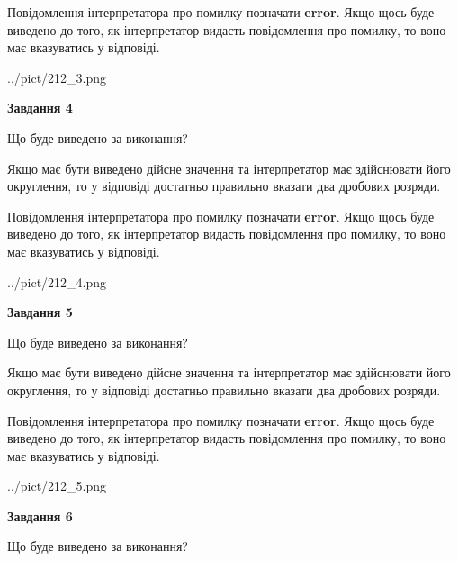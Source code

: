 \documentclass[12pt, ukrainian]{article}
\begin{document}
{\begin {Large}
Повідомлення інтерпретатора про помилку позначати \textbf{error}.
Якщо щось буде виведено до того, як інтерпретатор видасть повідомлення про помилку, 
то воно має вказуватись у відповіді. \par

\begin{center}
	{../pict/212_3.png}
\end{center}
\newpage

{\begin {center}\textbf{Завдання 4}\end {center}}\par
Що буде виведено за виконання? \par

Якщо має бути виведено дійсне значення та інтерпретатор має здійснювати його округлення, 
то у відповіді достатньо правильно вказати два дробових розряди.

Повідомлення інтерпретатора про помилку позначати \textbf{error}.
Якщо щось буде виведено до того, як інтерпретатор видасть повідомлення про помилку, 
то воно має вказуватись у відповіді. \par

\begin{center}
	{../pict/212_4.png}
\end{center}
\newpage

{\begin {center}\textbf{Завдання 5}\end {center}}\par
Що буде виведено за виконання? \par

Якщо має бути виведено дійсне значення та інтерпретатор має здійснювати його округлення, 
то у відповіді достатньо правильно вказати два дробових розряди.

Повідомлення інтерпретатора про помилку позначати \textbf{error}.
Якщо щось буде виведено до того, як інтерпретатор видасть повідомлення про помилку, 
то воно має вказуватись у відповіді. \par

\begin{center}
	{../pict/212_5.png}
\end{center}
\newpage

{\begin {center}\textbf{Завдання 6}\end {center}}\par
Що буде виведено за виконання? \par


\end{Large}}
\end{document}
